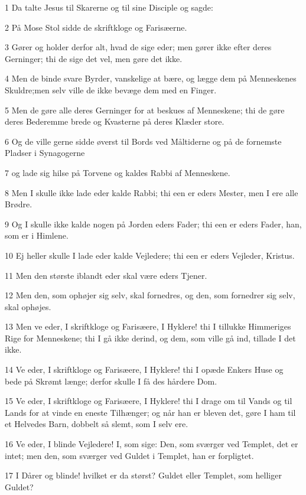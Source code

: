 \par 1 Da talte Jesus til Skarerne og til sine Disciple og sagde:
\par 2 På Mose Stol sidde de skriftkloge og Farisæerne.
\par 3 Gører og holder derfor alt, hvad de sige eder; men gører ikke efter deres Gerninger; thi de sige det vel, men gøre det ikke.
\par 4 Men de binde svare Byrder, vanskelige at bære, og lægge dem på Menneskenes Skuldre;men selv ville de ikke bevæge dem med en Finger.
\par 5 Men de gøre alle deres Gerninger for at beskues af Menneskene; thi de gøre deres Bederemme brede og Kvasterne på deres Klæder store.
\par 6 Og de ville gerne sidde øverst til Bords ved Måltiderne og på de fornemste Pladser i Synagogerne
\par 7 og lade sig hilse på Torvene og kaldes Rabbi af Menneskene.
\par 8 Men I skulle ikke lade eder kalde Rabbi; thi een er eders Mester, men I ere alle Brødre.
\par 9 Og I skulle ikke kalde nogen på Jorden eders Fader; thi een er eders Fader, han, som er i Himlene.
\par 10 Ej heller skulle I lade eder kalde Vejledere; thi een er eders Vejleder, Kristus.
\par 11 Men den største iblandt eder skal være eders Tjener.
\par 12 Men den, som ophøjer sig selv, skal fornedres, og den, som fornedrer sig selv, skal ophøjes.
\par 13 Men ve eder, I skriftkloge og Farisæere, I Hyklere! thi I tillukke Himmeriges Rige for Menneskene; thi I gå ikke derind, og dem, som ville gå ind, tillade I det ikke.
\par 14 Ve eder, I skriftkloge og Farisæere, I Hyklere! thi I opæde Enkers Huse og bede på Skrømt længe; derfor skulle I få des hårdere Dom.
\par 15 Ve eder, I skriftkloge og Farisæere, I Hyklere! thi I drage om til Vands og til Lands for at vinde en eneste Tilhænger; og når han er bleven det, gøre I ham til et Helvedes Barn, dobbelt så slemt, som I selv ere.
\par 16 Ve eder, I blinde Vejledere! I, som sige: Den, som sværger ved Templet, det er intet; men den, som sværger ved Guldet i Templet, han er forpligtet.
\par 17 I Dårer og blinde! hvilket er da størst? Guldet eller Templet, som helliger Guldet?
